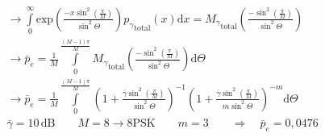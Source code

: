 \begin{align*}
	&\rightarrow\int\limits_0^\infty\mathrm{exp}\left(\frac{-x\sin^2\left(\frac{\pi}{M}\right)}{\sin^2\Theta}\right){p_\gamma}_\mathrm{total}\left(x\right)\mathrm{d}x={M_\gamma}_\mathrm{total}\left(\frac{-\sin^2\left(\frac{\pi}{M}\right)}{\sin^2\Theta}\right) \\
	&\rightarrow\bar{p}_e=\frac{1}{M}\int\limits_0^{\frac{\left(M-1\right)\pi}{M}}{M_\gamma}_\mathrm{total}\left(\frac{-\sin^2\left(\frac{\pi}{M}\right)}{\sin^2\Theta}\right)\mathrm{d}\Theta \\
	&\rightarrow\boxed{\bar{p}_e=\frac{1}{M}\int\limits_0^{\frac{\left(M-1\right)\pi}{M}}\left(1+\frac{\bar{\gamma}\sin^2\left(\frac{\pi}{M}\right)}{\sin^2\Theta}\right)^{-1}\left(1+\frac{\bar{\gamma}\sin^2\left(\frac{\pi}{M}\right)}{m\sin^2\Theta}\right)^{-m}\mathrm{d}\Theta} \\
	&\bar{\gamma}=10\,\mathrm{dB}\qquad M=8\rightarrow 8\mathrm{PSK}\qquad m=3\qquad\Rightarrow\quad\bar{p}_e=0,0476
\end{align*}
